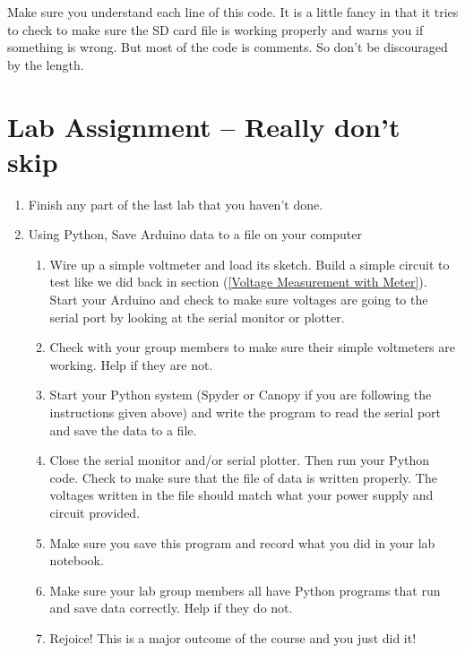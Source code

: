 Make sure you understand each line of this code. It is a little fancy in that it tries to check to make sure the SD card file is working properly and warns you if something is wrong. But most of the code is comments. So don't be discouraged by the length.

\section{Lab Assignment -- Really don't skip}

\begin{enumerate}
\item Finish any part of the last lab that you haven't done.

\item Using Python, Save Arduino data to a file on your computer

	\begin{enumerate}
	\item Wire up a simple voltmeter and load its sketch. Build a simple circuit to test like we did back in section (\ref{Voltage Measurement with Meter}). Start your Arduino and check to make sure voltages are going to the serial port by looking at the serial monitor or plotter.
	
	\item Check with your group members to make sure their simple voltmeters are working. Help if they are not.
	
	\item Start your Python system (Spyder or Canopy if you are following the instructions given above) and write the program to read the serial port and save the data to a file.
	
	\item Close the serial monitor and/or serial plotter. Then run your Python code. Check to make sure that the file of data is written properly. The voltages written in the file should match what your power supply and circuit provided.
	
	\item Make sure you save this program and record what you did in your lab notebook.
	
	\item Make sure your lab group members all have Python programs that run and save data correctly. Help if they do not.
	
	\item Rejoice!  This is a major outcome of the course and you just did it!
	\end{enumerate}

\end{enumerate}
